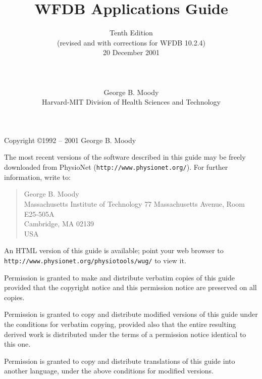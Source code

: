 \documentclass[twoside]{book}
\title{WFDB Applications Guide}
\author{Tenth Edition\\
(revised and with corrections for WFDB 10.2.4)\\
20 December 2001\\
\\
\\
\\
George B. Moody\\
Harvard-MIT Division of Health Sciences and Technology}
\date{}
\begin{document}
\maketitle

\pagestyle{empty}
\vspace*{\fill}
\noindent
Copyright \copyright 1992 -- 2001 George B. Moody

\vspace{1 in}
\noindent
The most recent versions of the software described in this guide may be
freely downloaded from PhysioNet ({\tt http://www.physionet.org/}).
For further information, write to:

\begin{quote}
George B. Moody\\
Massachusetts Institute of Technology
77 Massachusetts Avenue, Room E25-505A\\
Cambridge, MA 02139\\
USA\\
\end{quote}

An HTML version of this guide is available; point your web browser to
{\tt http://www.\-physio\-net.\-org/\-physio\-tools/\-wug/} to view it.

\vspace{0.2 in}
\noindent
Permission is granted to make and distribute verbatim copies of this
guide provided that the copyright notice and this permission notice are
preserved on all copies.

\vspace{0.2 in}
\noindent
Permission is granted to copy and distribute modified versions of this
guide under the conditions for verbatim copying, provided also that the
entire resulting derived work is distributed under the terms of a
permission notice identical to this one.

\vspace{0.2 in}
\noindent
Permission is granted to copy and distribute translations of this guide
into another language, under the above conditions for modified versions.
\end{document}
